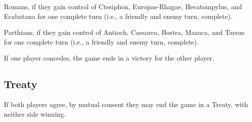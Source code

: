 Romans, if they gain control of Ctesiphon, Europas-Rhagae, Hecatompylus, and Ecabatana for one complete turn (i.e., a friendly and enemy turn, complete).

Parthians, if they gain control of Antioch, Caesarea, Bostra, Mazaca, and Tarsus for one complete turn (i.e., a friendly and enemy turn, complete).

If one player concedes, the game ends in a victory for the other player.

\subsection{Treaty}

If both players agree, by mutual consent they may end the game in a Treaty, with neither side winning.
